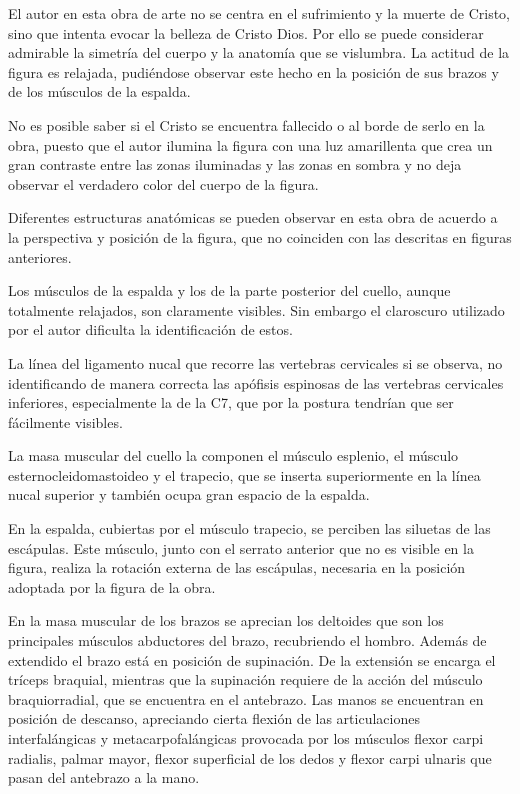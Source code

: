 El autor en esta obra de arte no se centra en el sufrimiento y la muerte de Cristo, sino que intenta evocar la belleza de Cristo Dios. Por ello se puede considerar admirable la simetría del cuerpo y la anatomía que se vislumbra. La actitud de la figura es relajada, pudiéndose observar este hecho en la posición de sus brazos y de los músculos de la espalda.

No es posible saber si el Cristo se encuentra fallecido o al borde de serlo en la obra, puesto que el autor ilumina la figura con una luz amarillenta que crea un gran contraste entre las zonas iluminadas y las zonas en sombra y no deja observar el verdadero color del cuerpo de la figura.

Diferentes estructuras anatómicas se pueden observar en esta obra de acuerdo a la perspectiva y posición de la figura, que no coinciden con las descritas en figuras anteriores.

Los músculos de la espalda y los de la parte posterior del cuello, aunque totalmente relajados, son claramente visibles. Sin embargo el claroscuro utilizado por el autor dificulta la identificación de estos.

La línea del ligamento nucal que recorre las vertebras cervicales si se observa, no identificando de manera correcta las apófisis espinosas de las vertebras cervicales inferiores, especialmente la de la C7, que por la postura tendrían que ser fácilmente visibles. 

La masa muscular del cuello la componen el músculo esplenio, el músculo esternocleidomastoideo y el trapecio, que se inserta superiormente en la línea nucal superior y también ocupa gran espacio de la espalda.

En la espalda, cubiertas por el músculo trapecio, se perciben las siluetas de las escápulas. Este músculo, junto con  el serrato anterior que no es visible en la figura, realiza la rotación externa de las escápulas, necesaria en la posición adoptada por la figura de la obra.

En la masa muscular de los brazos se aprecian los deltoides que son los principales músculos abductores del brazo, recubriendo el hombro. Además de extendido el brazo está en posición de supinación. De la extensión se encarga el tríceps braquial, mientras que la supinación requiere de la acción del músculo braquiorradial, que se encuentra en el antebrazo. Las manos se encuentran en posición de descanso, apreciando cierta flexión de las articulaciones interfalángicas y metacarpofalángicas provocada por los músculos flexor carpi radialis, palmar mayor, flexor superficial de los dedos y flexor carpi ulnaris que pasan del antebrazo a la mano.

